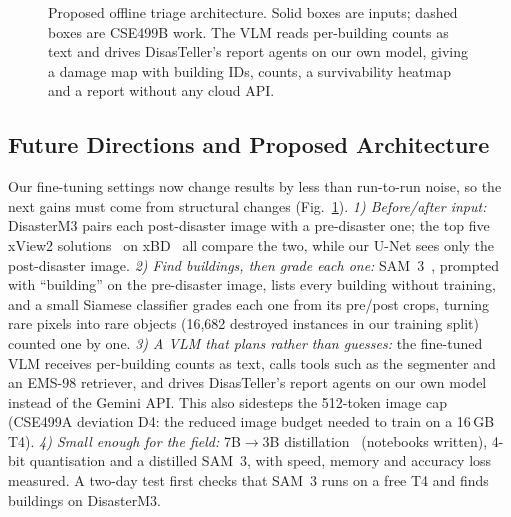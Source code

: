 \documentclass[conference]{IEEEtran}
\begin{document}
\begin{figure}[t]
\centering
{}
\caption{Proposed offline triage architecture. Solid boxes are inputs; dashed boxes are CSE499B work. The VLM reads per-building counts as text and drives DisasTeller's report agents on our own model, giving a damage map with building IDs, counts, a survivability heatmap and a report without any cloud API.}
\label{fig:system}
\end{figure}

\subsection{Future Directions and Proposed Architecture}
Our fine-tuning settings now change results by less than run-to-run noise, so the next gains must come from structural changes (Fig.~\ref{fig:system}). \textit{1) Before/after input:} DisasterM3 pairs each post-disaster image with a pre-disaster one; the top five xView2 solutions~\cite{xview2sol} on xBD~\cite{xbd} all compare the two, while our U-Net sees only the post-disaster image. \textit{2) Find buildings, then grade each one:} SAM~3~\cite{sam3}, prompted with ``building'' on the pre-disaster image, lists every building without training, and a small Siamese classifier grades each one from its pre/post crops, turning rare pixels into rare objects (16,682 destroyed instances in our training split) counted one by one. \textit{3) A VLM that plans rather than guesses:} the fine-tuned VLM receives per-building counts as text, calls tools such as the segmenter and an EMS-98 retriever, and drives DisasTeller's report agents on our own model instead of the Gemini API. This also sidesteps the 512-token image cap (CSE499A deviation D4: the reduced image budget needed to train on a 16\,GB T4). \textit{4) Small enough for the field:} 7B$\rightarrow$3B distillation~\cite{seqkd} (notebooks written), 4-bit quantisation and a distilled SAM~3, with speed, memory and accuracy loss measured. A two-day test first checks that SAM~3 runs on a free T4 and finds buildings on DisasterM3.
\end{document}
